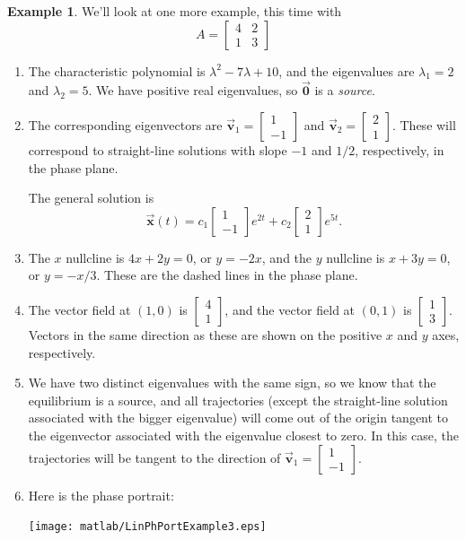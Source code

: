\documentclass[reqno]{immbook}
\newcommand{\BV}{\vec{\textbf{v}}}
\newcommand{\BX}{\vec{\textbf{x}}}
\newcommand{\BZero}{\vec{\textbf{0}}}  %
\numberwithin{equation}{chapter}
\numberwithin{question}{section}
\numberwithin{theorem}{chapter}
\numberwithin{figure}{chapter}
\theoremstyle{definition}
\newtheorem{example}{Example}[section]
\begin{document}
\newpage

\begin{example}
We'll look at one more example, this time with
\[
   A = \begin{bmatrix}
            4 & 2 \\ 1 & 3
       \end{bmatrix}
\]
\begin{enumerate}
\item
The characteristic polynomial is
$\lambda^2 -7\lambda +10$, and the eigenvalues are
$\lambda_1 = 2$ and $\lambda_2 = 5$.
We have positive real eigenvalues, so
$\BZero$ is a \emph{source}.
\item
The corresponding eigenvectors are
$\BV_1 = \begin{bmatrix} 1 \\ -1 \end{bmatrix}$
and
$\BV_2 = \begin{bmatrix} 2 \\ 1 \end{bmatrix}$.
These will correspond to straight-line solutions with
slope $-1$ and $1/2$, respectively, in the phase plane.

The general solution is
\begin{equation}
\BX(t) = c_1 \begin{bmatrix} 1 \\ -1 \end{bmatrix} e^{2t}
   + c_2 \begin{bmatrix} 2 \\ 1 \end{bmatrix} e^{5t}.
\end{equation}
\item
The $x$ nullcline is $4x+2y=0$, or $y = -2x$, and the
$y$ nullcline is $x+3y=0$, or $y=-x/3$.  These are the
dashed lines in the phase plane.
\item
The vector field at $(1,0)$ is $\begin{bmatrix} 4 \\ 1 \end{bmatrix}$,
and the vector field at $(0,1)$
is $\begin{bmatrix} 1 \\ 3 \end{bmatrix}$.  Vectors in the
same direction as these are shown on the positive $x$ and $y$ axes,
respectively.
\item We have two distinct eigenvalues with the same sign, so
we know that the equilibrium is a source, and all trajectories
(except the straight-line solution associated with the
bigger eigenvalue) will come out of the origin
tangent to the eigenvector associated with the eigenvalue
closest to zero.  In this case, the trajectories will
be tangent to the direction of
$\BV_1 = \begin{bmatrix}1 \\ -1 \end{bmatrix}$.
\item
Here is the phase portrait:

\noindent
\centerline{\texttt{[image: matlab/LinPhPortExample3.eps]}}
\end{enumerate}
\end{example}
%
\newpage
\end{document}
